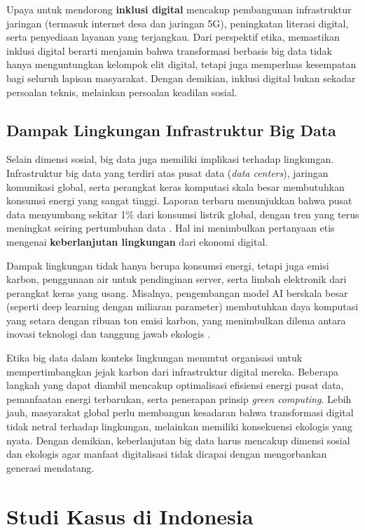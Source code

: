 Upaya untuk mendorong \textbf{inklusi digital} mencakup pembangunan infrastruktur jaringan (termasuk internet desa dan jaringan 5G), peningkatan literasi digital, serta penyediaan layanan yang terjangkau. Dari perspektif etika, memastikan inklusi digital berarti menjamin bahwa transformasi berbasis big data tidak hanya menguntungkan kelompok elit digital, tetapi juga memperluas kesempatan bagi seluruh lapisan masyarakat. Dengan demikian, inklusi digital bukan sekadar persoalan teknis, melainkan persoalan keadilan sosial.

\subsection{Dampak Lingkungan Infrastruktur Big Data}

Selain dimensi sosial, big data juga memiliki implikasi terhadap lingkungan. Infrastruktur big data yang terdiri atas pusat data (\textit{data centers}), jaringan komunikasi global, serta perangkat keras komputasi skala besar membutuhkan konsumsi energi yang sangat tinggi. Laporan terbaru menunjukkan bahwa pusat data menyumbang sekitar 1\% dari konsumsi listrik global, dengan tren yang terus meningkat seiring pertumbuhan data \cite{iea2022}. Hal ini menimbulkan pertanyaan etis mengenai \textbf{keberlanjutan lingkungan} dari ekonomi digital.  

Dampak lingkungan tidak hanya berupa konsumsi energi, tetapi juga emisi karbon, penggunaan air untuk pendinginan server, serta limbah elektronik dari perangkat keras yang usang. Misalnya, pengembangan model AI berskala besar (seperti deep learning dengan miliaran parameter) membutuhkan daya komputasi yang setara dengan ribuan ton emisi karbon, yang menimbulkan dilema antara inovasi teknologi dan tanggung jawab ekologis \cite{strubell2019energy}.  

Etika big data dalam konteks lingkungan menuntut organisasi untuk mempertimbangkan jejak karbon dari infrastruktur digital mereka. Beberapa langkah yang dapat diambil mencakup optimalisasi efisiensi energi pusat data, pemanfaatan energi terbarukan, serta penerapan prinsip \textit{green computing}. Lebih jauh, masyarakat global perlu membangun kesadaran bahwa transformasi digital tidak netral terhadap lingkungan, melainkan memiliki konsekuensi ekologis yang nyata. Dengan demikian, keberlanjutan big data harus mencakup dimensi sosial dan ekologis agar manfaat digitalisasi tidak dicapai dengan mengorbankan generasi mendatang.


\section{Studi Kasus di Indonesia}

